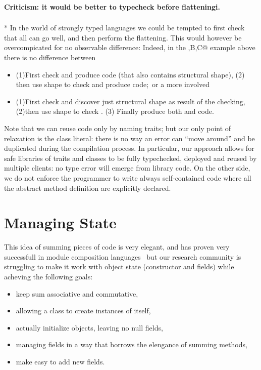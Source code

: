 \paragraph*{Criticism: it would be better to typecheck before flatteningi.}${}_{}$\\*
In the world of strongly typed languages we could be tempted to
first check that all can go well, and then perform the flattening.
This would however be overcompicated for no observable difference:
Indeed, in the \Q@A,B,C@ example above there is no difference
between
\begin{itemize}
\item  (1)First check \Q@B@ and produce \Q@B@ code (that also contains \Q@B@ structural shape),
  (2) then use \Q@B@ shape to check \Q@C@ and produce \Q@C@ code;\ 
or a more involved
\item  (1)First check \Q@B@ and discover just \Q@B@ structural shape as result of the checking,
  (2)then use \Q@B@ shape to check \Q@C@.
  (3) Finally produce both \Q@B@ and \Q@C@ code.
\end{itemize}

Note that we can reuse code only by naming traits; but our only point of relaxation is the class literal: there is no way an error can ``move around'' and be duplicated during the compilation process.
In particular, our approach allows for safe libraries of traits and classes to be fully typechecked, deployed and reused by multiple clients: no type error will emerge from library code.
On the other side, we do not enforce the programmer to write always self-contained code where all the abstract method definition are explicitly declared.

\section{Managing State}
This idea of summing pieces of code is very elegant,
and has proven very successfull in module composition languages~\cite{} but our research community is struggling to
make it work with object state (constructor and fields) while acheving the following goals:

\begin{itemize}
\item keep sum associative and commutative,
\item allowing a class to create instances of itself,
\item actually initialize objects, leaving no null fields,
\item managing fields in a way that borrows the elengance of summing methods,
\item make easy to add new fields.
\end{itemize}


